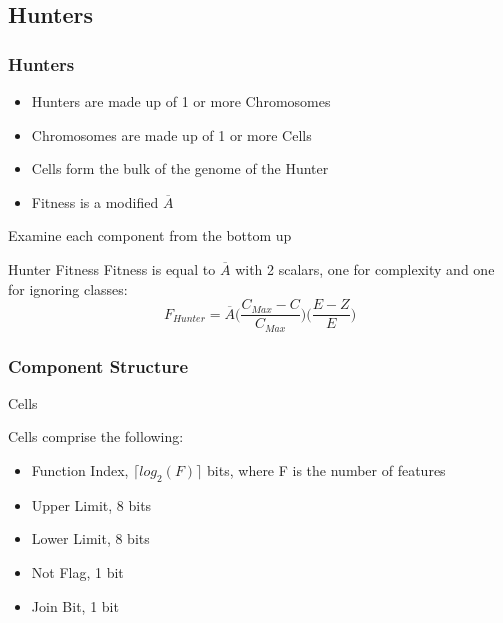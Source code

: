 \documentclass{beamer}
\begin{document}
\subsection{Hunters}
\begin{frame}
	\frametitle{Hunters}
		\begin{itemize}
		\item Hunters are made up of 1 or more Chromosomes
		\item Chromosomes are made up of 1 or more Cells
		\item Cells form the bulk of the genome of the Hunter
		\item Fitness is a modified $\overline{A}$
	\end{itemize}
Examine each component from the bottom up
\end{frame}

\begin{frame}{Hunter Fitness}
	Fitness is equal to $\overline{A}$ with 2 scalars, one for complexity and one for ignoring classes:
	$$F_{Hunter} = \overline{A} \bigg( \frac{C_{Max} - C}{C_{Max}}\bigg) \bigg( \frac{E-Z}{E}\bigg)$$
	  
\end{frame}

\subsubsection{Component Structure}
\begin{frame}{Cells}

Cells comprise the following:
\begin{itemize}
	\item Function Index, \(\lceil log_2(F)\rceil\) bits, where F is the number of features
	\item Upper Limit, 8 bits
	\item Lower Limit, 8 bits
	\item Not Flag, 1 bit
	\item Join Bit, 1 bit
\end{itemize}
\end{frame}
\end{document}
